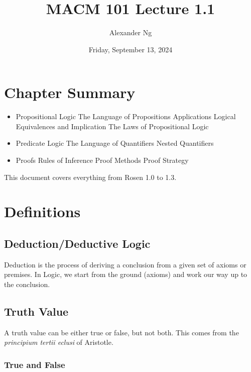 \documentclass[12pt]{article}
\begin{document}
\title{MACM 101 Lecture 1.1}
\author{Alexander Ng}
\date{Friday, September 13, 2024}

\maketitle

\section{Chapter Summary}

\begin{itemize}
  \item Propositional Logic
    \subitem The Language of Propositions
    \subitem Applications
    \subitem Logical Equivalences and Implication
    \subitem The Laws of Propositional Logic

  \item Predicate Logic
    \subitem The Language of Quantifiers
    \subitem Nested Quantifiers

  \item Proofs
    \subitem Rules of Inference
    \subitem Proof Methods
    \subitem Proof Strategy
\end{itemize}

This document covers everything from Rosen 1.0 to 1.3.

\pagebreak
\section{Definitions}

\subsection{Deduction/Deductive Logic}

Deduction is the process of deriving a conclusion from a given set of axioms 
or premises. In Logic, we start from the ground (axioms) and work our way up to
the conclusion.

\subsection{Truth Value}

A truth value can be either true or false, but not both. This comes from the
\textit{principium tertii eclusi} of Aristotle.

\subsubsection{True and False}
\end{document}
